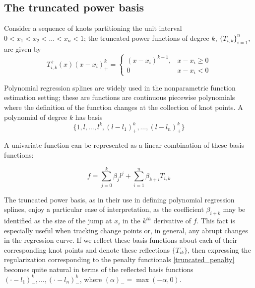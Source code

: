 \documentclass[12pt]{article}
\begin{document}
\subsection{The truncated power basis}
Consider a sequence of knots partitioning the unit interval $0 < x_1 < x_2 < \dots <x_n < 1$; the truncated power functions of degree $k$, $\lbrace T_{i,k} \rbrace_{i=1}^n$, are given by
\[
T^+_{i,k}\left(x\right) \left(x - x_i\right)^{k}_+ = \left\{\begin{array}{lr} \left(x-x_i\right)^{k-1}, & x-x_i \ge0\\ 0 & x-x_i < 0\end{array}\right.
\]

Polynomial regression splines are widely used in the nonparametric function estimation setting; these are functions are continuous piecewise polynomials where the definition of the function changes at the collection of knot points. A polynomial of degree $k$ has basis
\[
\lbrace 1,l,\dots,l^k, \left(l - l_1\right)^{k}_+,\dots, \left(l - l_n\right)^{k}_+ \rbrace
\]

A univariate function can be represented as a linear combination of these basis functions: 

\[
f = \sum_{j=0}^k \beta_j l^j + \sum_{i=1}^n \beta_{k+i} T_{i,k}
\]
\noindent

The truncated power basis, as in their use in defining polynomial regression splines, enjoy a particular ease of interpretation, as the coefficient $\beta_{i+k}$ may be identified as the size of the jump at $x_i$ in the $k^{th}$ derivative of $f$. This fact is especially useful when tracking change points or, in general, any abrupt changes in the regression curve. If we reflect these basis functions about each of their corresponding knot points and denote these reflections $\lbrace T^-_{ik}\rbrace$, then expressing the regularization corresponding to the penalty functionals \eqref{truncated_penalty} becomes quite natural in terms of the reflected basis functions $\left(\cdot - l_1 \right)^k_-,\dots, \left(\cdot - l_n \right)^k_-$, where $\left( \alpha \right)_- = \max\left(-\alpha,0\right)$.
\end{document}
